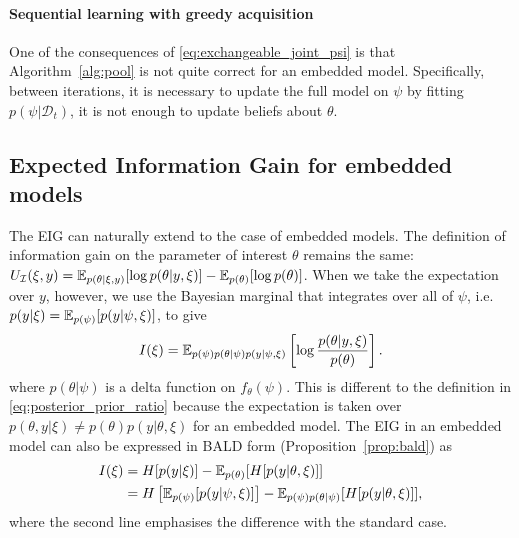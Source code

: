 \documentclass[a4paper, 10pt]{report}
\theoremstyle{plain}
\begin{document}
	\paragraph{Sequential learning with greedy acquisition}
	One of the consequences of \eqref{eq:exchangeable_joint_psi} is that Algorithm~\ref{alg:pool} is not quite correct for an embedded model.
	Specifically, between iterations, it is necessary to update the full model on $\psi$ by fitting $p(\psi|\mathcal{D}_t)$, it is not enough to update beliefs about $\theta$.
	
	
	
	
	\subsection{Expected Information Gain for embedded models}
	\label{sec:embedded_eig}
	The EIG can naturally extend to the case of embedded models.
	The definition of information gain on the parameter of interest $\theta$ remains the same: $U_\mathcal{I}(\xi,y) = \mathbb{E}_{p(\theta|\xi,y)}[\log p(\theta|y,\xi)] - \mathbb{E}_{p(\theta)}[\log p(\theta)]$.
	When we take the expectation over $y$, however, we use the Bayesian marginal that integrates over all of $\psi$, i.e.~$p(y|\xi) = \mathbb{E}_{p(\psi)}[p(y|\psi,\xi)]$, to give
	\begin{equation}
	I(\xi) = \mathbb{E}_{p(\psi)p(\theta|\psi)p(y|\psi,\xi)}\left[\log \frac{p(\theta|y,\xi)}{p(\theta)} \right].
	\end{equation}
	where $p(\theta|\psi)$ is a delta function on $f_\theta(\psi)$.
	This is different to the definition in \eqref{eq:posterior_prior_ratio} because the expectation is taken over $p(\theta,y|\xi) \ne p(\theta)p(y|\theta,\xi)$ for an embedded model.
	The EIG in an embedded model can also be expressed in BALD form (Proposition~\ref{prop:bald}) as
	\begin{align}
	I(\xi) &= H[p(y|\xi)] - \mathbb{E}_{p(\theta)}[H[p(y|\theta,\xi)]] \\
	&=H\left[\mathbb{E}_{p(\psi)}[p(y|\psi,\xi)]\right] - \mathbb{E}_{p(\psi)p(\theta|\psi)}[H[p(y|\theta,\xi)]],
	\end{align}
	where the second line emphasises the difference with the standard case.
	
\end{document}
